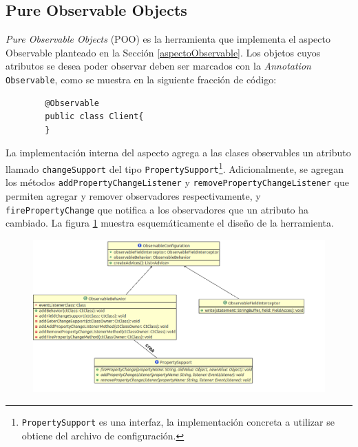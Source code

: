 \subsection{Pure Observable Objects}
	\label{poo}
	\emph{Pure Observable Objects} (POO) es la herramienta que implementa el
	aspecto Observable planteado en la Sección \ref{aspectoObservable}.
	Los objetos cuyos atributos se desea poder observar deben ser marcados con
	la \emph{Annotation} \lstinline|Observable|, como
	se muestra en la siguiente fracción de código:
	
	\begin{lstlisting} 
		@Observable
		public class Client{
		}
	\end{lstlisting}
	
	La implementación interna del aspecto agrega a las clases observables un
	atributo llamado \lstinline|changeSupport| del tipo
	\lstinline|PropertySupport|\footnote{\lstinline|PropertySupport| es una
	interfaz, la implementación concreta a utilizar se obtiene del archivo de
	configuración.}.
	Adicionalmente, se agregan los métodos 
	\lstinline|addPropertyChangeListener| y
	\lstinline|removePropertyChangeListener| que permiten agregar 
	y remover observadores respectivamente, y \lstinline|firePropertyChange|
	que notifica a los observadores que un atributo ha cambiado.
	La figura \ref{fig:poo} muestra esquemáticamente el diseño de la herramienta.
	
	\begin{figure}[h]
		\includegraphics[scale=0.45]{img/poo}
	 	\label{fig:poo}
	 	\caption{}
	\end{figure}
	